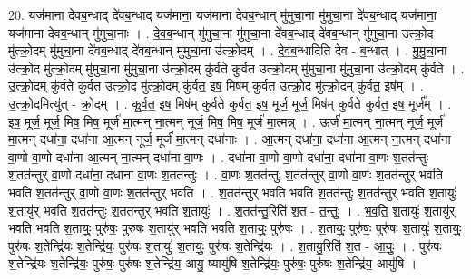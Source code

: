 \documentclass[17pt]{extarticle}
\begin{document}
20. यज॑माना देवब॒न्धाद् दे॑वब॒न्धाद् यज॑माना॒ यज॑माना देवब॒न्धान् मु॑मुचा॒ना मु॑मुचा॒ना दे॑वब॒न्धाद् यज॑माना॒ यज॑माना देवब॒न्धान् मु॑मुचा॒नाः । . दे॒व॒ब॒न्धान् मु॑मुचा॒ना मु॑मुचा॒ना दे॑वब॒न्धाद् दे॑वब॒न्धान् मु॑मुचा॒ना उ॑त्क्रो॒द मु॑त्क्रो॒दम् मु॑मुचा॒ना दे॑वब॒न्धाद् दे॑वब॒न्धान् मु॑मुचा॒ना उ॑त्क्रो॒दम् । . दे॒व॒ब॒न्धादिति॑ देव - ब॒न्धात् । . मु॒मु॒चा॒ना उ॑त्क्रो॒द मु॑त्क्रो॒दम् मु॑मुचा॒ना मु॑मुचा॒ना उ॑त्क्रो॒दम् कु॑र्वते कुर्वत उत्क्रो॒दम् मु॑मुचा॒ना मु॑मुचा॒ना उ॑त्क्रो॒दम् कु॑र्वते । . उ॒त्क्रो॒दम् कु॑र्वते कुर्वत उत्क्रो॒द मु॑त्क्रो॒दम् कु॑र्वत॒ इष॒ मिष॑म् कुर्वत उत्क्रो॒द मु॑त्क्रो॒दम् कु॑र्वत॒ इष᳚म् । . उ॒त्क्रो॒दमित्यु॑त् - क्रो॒दम् । . कु॒र्व॒त॒ इष॒ मिष॑म् कुर्वते कुर्वत॒ इष॒ मूर्ज॒ मूर्ज॒ मिष॑म् कुर्वते कुर्वत॒ इष॒ मूर्ज᳚म् । . इष॒ मूर्ज॒ मूर्ज॒ मिष॒ मिष॒ मूर्ज॑ मा॒त्मन् ना॒त्मन् नूर्ज॒ मिष॒ मिष॒ मूर्ज॑ मा॒त्मन्न् । . ऊर्ज॑ मा॒त्मन् ना॒त्मन् नूर्ज॒ मूर्ज॑ मा॒त्मन् दधा॑ना॒ दधा॑ना आ॒त्मन् नूर्ज॒ मूर्ज॑ मा॒त्मन् दधा॑नाः । . आ॒त्मन् दधा॑ना॒ दधा॑ना आ॒त्मन् ना॒त्मन् दधा॑ना वा॒णो वा॒णो दधा॑ना आ॒त्मन् ना॒त्मन् दधा॑ना वा॒णः । . दधा॑ना वा॒णो वा॒णो दधा॑ना॒ दधा॑ना वा॒णः श॒तत॑न्तुः श॒तत॑न्तुर् वा॒णो दधा॑ना॒ दधा॑ना वा॒णः श॒तत॑न्तुः । . वा॒णः श॒तत॑न्तुः श॒तत॑न्तुर् वा॒णो वा॒णः श॒तत॑न्तुर् भवति भवति श॒तत॑न्तुर् वा॒णो वा॒णः श॒तत॑न्तुर् भवति । . श॒तत॑न्तुर् भवति भवति श॒तत॑न्तुः श॒तत॑न्तुर् भवति श॒तायुः॑ श॒तायु॑र् भवति श॒तत॑न्तुः श॒तत॑न्तुर् भवति श॒तायुः॑ । . श॒तत॑न्तु॒रिति॑ श॒त - त॒न्तुः॒ । . भ॒व॒ति॒ श॒तायुः॑ श॒तायु॑र् भवति भवति श॒तायुः॒ पुरु॑षः॒ पुरु॑षः श॒तायु॑र् भवति भवति श॒तायुः॒ पुरु॑षः । . श॒तायुः॒ पुरु॑षः॒ पुरु॑षः श॒तायुः॑ श॒तायुः॒ पुरु॑षः श॒तेन्द्रि॑यः श॒तेन्द्रि॑यः॒ पुरु॑षः श॒तायुः॑ श॒तायुः॒ पुरु॑षः श॒तेन्द्रि॑यः । . श॒तायु॒रिति॑ श॒त - आ॒युः॒ । . पुरु॑षः श॒तेन्द्रि॑यः श॒तेन्द्रि॑यः॒ पुरु॑षः॒ पुरु॑षः श॒तेन्द्रि॑य॒ आयु॒ ष्यायु॑षि श॒तेन्द्रि॑यः॒ पुरु॑षः॒ पुरु॑षः श॒तेन्द्रि॑य॒ आयु॑षि । \newline
\end{document}
